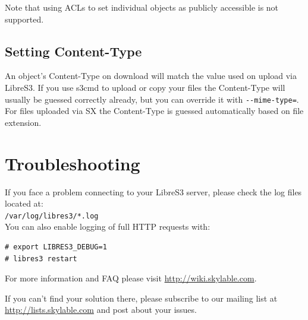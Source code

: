Note that using ACLs to set individual objects as publicly accessible
is not supported.

\section{Setting Content-Type}

An object's Content-Type on download will match the value used on upload
via LibreS3.
If you use s3cmd to upload or copy your files the Content-Type will usually be guessed
correctly already, but you can override it with \verb|--mime-type=|.
For files uploaded via SX the Content-Type is guessed automatically based on
file extension.

\chapter{Troubleshooting}
If you face a problem connecting to your LibreS3 server, please check
the log files located at:\\ \verb|/var/log/libres3/*.log|\\
You can also enable logging of full HTTP requests with:

\begin{lstlisting}
# export LIBRES3_DEBUG=1
# libres3 restart
\end{lstlisting}

For more information and FAQ please visit \url{http://wiki.skylable.com}.

If you can't find your solution there, please subscribe to our mailing list
at \url{http://lists.skylable.com} and post about your issues.

